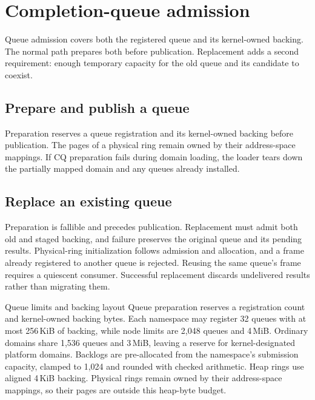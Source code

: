 \section{Completion-queue admission}

Queue admission covers both the registered queue and its kernel-owned backing.
The normal path prepares both before publication. Replacement adds a second
requirement: enough temporary capacity for the old queue and its candidate to
coexist.

\subsection{Prepare and publish a queue}

Preparation reserves a queue registration and its kernel-owned backing before
publication. The pages of a physical ring remain owned by their address-space
mappings. If CQ preparation fails during domain loading, the loader tears down
the partially mapped domain and any queues already installed.

\subsection{Replace an existing queue}

Preparation is fallible and precedes publication. Replacement must admit
both old and staged backing, and failure preserves the original queue and its
pending results. Physical-ring initialization follows admission and allocation,
and a frame already registered to another queue is rejected. Reusing the same
queue's frame requires a quiescent consumer. Successful replacement discards
undelivered results rather than migrating them.

\begin{implementationdetail}{Queue limits and backing layout}
Queue preparation reserves a registration count and kernel-owned backing
bytes. Each namespace may register 32 queues with at most 256\,KiB of backing, while
node limits are 2,048 queues and 4\,MiB. Ordinary domains share 1,536 queues
and 3\,MiB, leaving a reserve for kernel-designated platform domains.
Backlogs are pre-allocated from the namespace's submission capacity, clamped
to 1,024 and rounded with checked arithmetic. Heap rings use aligned
4\,KiB backing. Physical rings remain owned by their address-space mappings, so
their pages are outside this heap-byte budget.
\end{implementationdetail}

